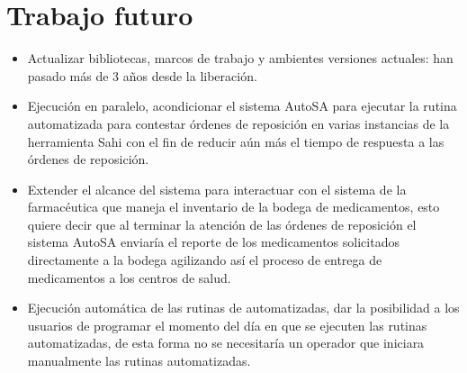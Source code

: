 \section{Trabajo futuro}
\begin{itemize}
	\item Actualizar bibliotecas, marcos de trabajo y ambientes versiones actuales: han pasado más de 3 años desde la liberación.
	\item Ejecución en paralelo, acondicionar el sistema AutoSA para ejecutar la rutina automatizada para contestar órdenes de reposición en varias instancias de la herramienta Sahi con el fin de reducir aún más el tiempo de respuesta a las órdenes de reposición.
	\item Extender el alcance del sistema para interactuar con el sistema de la farmacéutica que maneja el inventario de la bodega de medicamentos, esto quiere decir que al terminar la atención de las órdenes de reposición el sistema AutoSA enviaría el reporte de los medicamentos solicitados directamente a la bodega agilizando así el proceso de entrega de medicamentos a los centros de salud. 
	\item Ejecución automática de las rutinas de automatizadas, dar la posibilidad a los usuarios de programar el momento del día en que se ejecuten las rutinas automatizadas, de esta forma no se necesitaría un operador que iniciara manualmente las rutinas automatizadas.
\end{itemize}

